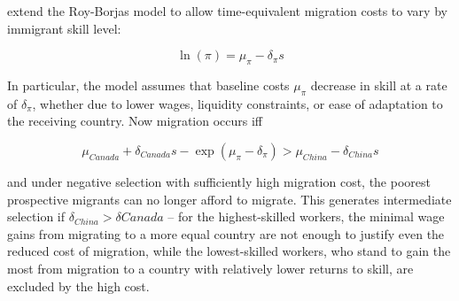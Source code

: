 

\citet{chiquiarhanson2005} extend the Roy-Borjas model to allow time-equivalent migration costs to vary by immigrant skill level:

\begin{equation}
    \ln(\pi) = \mu_{\pi} - \delta_{\pi}s
\end{equation}

In particular, the model assumes that baseline costs $\mu_{\pi}$ decrease in skill at a rate of $\delta_{\pi}$, whether due to lower wages, liquidity constraints, or ease of adaptation to the receiving country. Now migration occurs iff

\begin{equation}
    \mu_{Canada} + \delta_{Canada}s - \exp(\mu_{\pi}-\delta_{\pi}) > \mu_{China} - \delta_{China}s
\end{equation}

and under negative selection with sufficiently high migration cost, the poorest prospective migrants can no longer afford to migrate. This generates intermediate selection if $\delta_{China} > \delta{Canada}$ -- for the highest-skilled workers, the minimal wage gains from migrating to a more equal country are not enough to justify even the reduced cost of migration, while the lowest-skilled workers, who stand to gain the most from migration to a country with relatively lower returns to skill, are excluded by the high cost.

